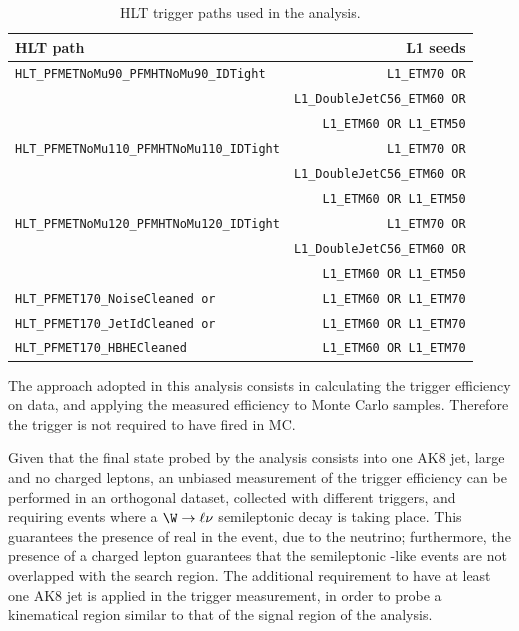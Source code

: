 \begin{table}[!htb]
\centering
  \caption{HLT trigger paths used in the analysis.\label{tab:trig_default}}
 \begin{tabular}{l|r} 
 \hline
 HLT path & L1 seeds\\
 \hline
 \hline
 \texttt{HLT\_PFMETNoMu90\_PFMHTNoMu90\_IDTight} & \texttt{L1\_ETM70 OR} \\
& \texttt{L1\_DoubleJetC56\_ETM60 OR}\\
&  \texttt{L1\_ETM60 OR L1\_ETM50}\\
 \hline
 \texttt{HLT\_PFMETNoMu110\_PFMHTNoMu110\_IDTight} & \texttt{L1\_ETM70 OR} \\
& \texttt{L1\_DoubleJetC56\_ETM60 OR}\\
&  \texttt{L1\_ETM60 OR L1\_ETM50}\\
 \hline
 \texttt{HLT\_PFMETNoMu120\_PFMHTNoMu120\_IDTight} & \texttt{L1\_ETM70 OR} \\
& \texttt{L1\_DoubleJetC56\_ETM60 OR}\\
&  \texttt{L1\_ETM60 OR L1\_ETM50}\\
\hline
 \texttt{HLT\_PFMET170\_NoiseCleaned or} & \texttt{L1\_ETM60 OR L1\_ETM70}\\
\hline
 \texttt{HLT\_PFMET170\_JetIdCleaned or} & \texttt{L1\_ETM60 OR L1\_ETM70}\\
\hline
 \texttt{HLT\_PFMET170\_HBHECleaned} & \texttt{L1\_ETM60 OR L1\_ETM70}\\
 \hline
 \end{tabular}
\end{table}

\noindent The approach adopted in this analysis consists in calculating the trigger efficiency on data, and applying the measured efficiency to Monte Carlo samples. Therefore the trigger is not required to have fired in MC.

\noindent Given that the final state probed by the analysis consists into one AK8 jet, large \MET and no charged leptons, an unbiased measurement of the \MET trigger efficiency can be performed in an orthogonal dataset, collected with different triggers, and requiring events where a $\W \rightarrow \ell \nu$ semileptonic decay is taking place. This guarantees the presence of real \met in the event, due to the neutrino; furthermore, the presence of a charged lepton guarantees that the semileptonic \W-like events are not overlapped with the search region. The additional requirement to have at least one AK8 jet is applied in the trigger measurement, in order to probe a kinematical region similar to that of the signal region of the analysis.

